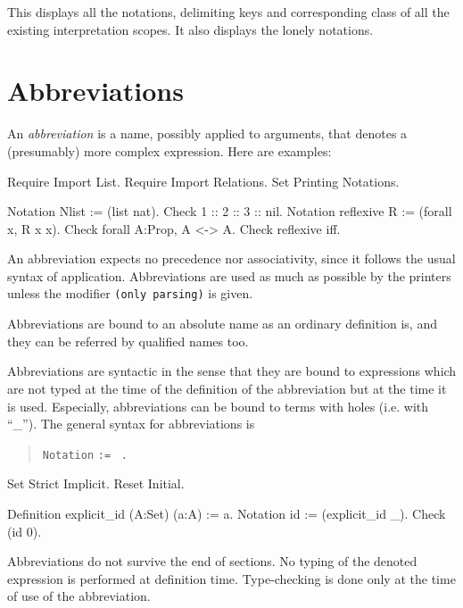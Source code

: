 This displays all the notations, delimiting keys and corresponding
class of all the existing interpretation scopes.
It also displays the lonely notations.

\section[Abbreviations]{Abbreviations
\label{Abbreviations}
}

An {\em abbreviation} is a name, possibly applied to arguments, that
denotes a (presumably) more complex expression. Here are examples:

\begin{coq_eval}
Require Import List.
Require Import Relations.
Set Printing Notations.
\end{coq_eval}
\begin{coq_example}
Notation Nlist := (list nat).
Check 1 :: 2 :: 3 :: nil.
Notation reflexive R := (forall x, R x x).
Check forall A:Prop, A <-> A.
Check reflexive iff.
\end{coq_example}

An abbreviation expects no precedence nor associativity, since it
follows the usual syntax of application. Abbreviations are used as
much as possible by the {\Coq} printers unless the modifier
\verb=(only parsing)= is given.

Abbreviations are bound to an absolute name as an ordinary
definition is, and they can be referred by qualified names too.

Abbreviations are syntactic in the sense that they are bound to
expressions which are not typed at the time of the definition of the
abbreviation but at the time it is used. Especially, abbreviations can
be bound to terms with holes (i.e. with ``\_''). The general syntax
for abbreviations is
\begin{quote}
 \texttt{Notation} {\ident} \sequence{\ident} {\ident} \texttt{:=} {\term} 
 ~\verb=.=
\end{quote}

\Example
\begin{coq_eval}
Set Strict Implicit.
Reset Initial.
\end{coq_eval}
\begin{coq_example}
Definition explicit_id (A:Set) (a:A) := a.
Notation id := (explicit_id _).
Check (id 0).
\end{coq_example}

Abbreviations do not survive the end of sections. No typing of the denoted
expression is performed at definition time. Type-checking is done only
at the time of use of the abbreviation.

